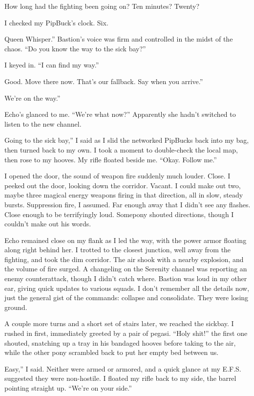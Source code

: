 How long had the fighting been going on? Ten minutes? Twenty?

I checked my PipBuck’s clock. Six.

\leavevmode{}Queen Whisper.” Bastion’s voice was firm and controlled in the midst of the chaos. “Do you know the way to the sick bay?”

I keyed in. “I can find my way.”

\leavevmode{}Good. Move there now. That’s our fallback. Say when you arrive.”

\leavevmode{}We’re on the way.”

Echo’s glanced to me. “We’re what now?” Apparently she hadn’t switched to listen to the new channel.

\leavevmode{}Going to the sick bay,” I said as I slid the networked PipBucks back into my bag, then turned back to my own. I took a moment to double-check the local map, then rose to my hooves. My rifle floated beside me. “Okay. Follow me.”

I opened the door, the sound of weapon fire suddenly much louder. Close. I peeked out the door, looking down the corridor. Vacant. I could make out two, maybe three magical energy weapons firing in that direction, all in slow, steady bursts. Suppression fire, I assumed. Far enough away that I didn’t see any flashes. Close enough to be terrifyingly loud. Somepony shouted directions, though I couldn’t make out his words.

Echo remained close on my flank as I led the way, with the power armor floating along right behind her. I trotted to the closest junction, well away from the fighting, and took the dim corridor. The air shook with a nearby explosion, and the volume of fire surged. A changeling on the Serenity channel was reporting an enemy counterattack, though I didn’t catch where. Bastion was loud in my other ear, giving quick updates to various squads. I don’t remember all the details now, just the general gist of the commands: collapse and consolidate. They were losing ground.

A couple more turns and a short set of stairs later, we reached the sickbay. I rushed in first, immediately greeted by a pair of pegasi. “Holy shit!” the first one shouted, snatching up a tray in his bandaged hooves before taking to the air, while the other pony scrambled back to put her empty bed between us.

\leavevmode{}Easy,” I said. Neither were armed or armored, and a quick glance at my E.F.S. suggested they were non-hostile. I floated my rifle back to my side, the barrel pointing straight up. “We’re on your side.”

